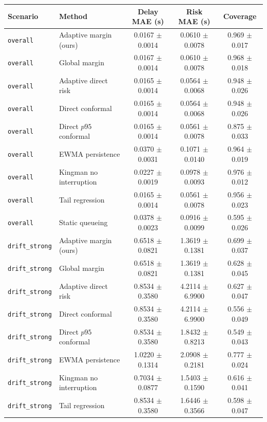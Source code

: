 \begin{tabular}{llccc}
\hline
Scenario & Method & Delay MAE (s) & Risk MAE (s) & Coverage \\
\hline
\texttt{overall} & Adaptive margin (ours) & 0.0167 $\pm$ 0.0014 & 0.0610 $\pm$ 0.0078 & 0.969 $\pm$ 0.017 \\
\texttt{overall} & Global margin & 0.0167 $\pm$ 0.0014 & 0.0610 $\pm$ 0.0078 & 0.968 $\pm$ 0.018 \\
\texttt{overall} & Adaptive direct risk & 0.0165 $\pm$ 0.0014 & 0.0564 $\pm$ 0.0068 & 0.948 $\pm$ 0.026 \\
\texttt{overall} & Direct conformal & 0.0165 $\pm$ 0.0014 & 0.0564 $\pm$ 0.0068 & 0.948 $\pm$ 0.026 \\
\texttt{overall} & Direct $p95$ conformal & 0.0165 $\pm$ 0.0014 & 0.0561 $\pm$ 0.0078 & 0.875 $\pm$ 0.033 \\
\texttt{overall} & EWMA persistence & 0.0370 $\pm$ 0.0031 & 0.1071 $\pm$ 0.0140 & 0.964 $\pm$ 0.019 \\
\texttt{overall} & Kingman no interruption & 0.0227 $\pm$ 0.0019 & 0.0978 $\pm$ 0.0093 & 0.976 $\pm$ 0.012 \\
\texttt{overall} & Tail regression & 0.0165 $\pm$ 0.0014 & 0.0561 $\pm$ 0.0078 & 0.956 $\pm$ 0.023 \\
\texttt{overall} & Static queueing & 0.0378 $\pm$ 0.0023 & 0.0916 $\pm$ 0.0099 & 0.595 $\pm$ 0.026 \\
\hline
\texttt{drift\_strong} & Adaptive margin (ours) & 0.6518 $\pm$ 0.0821 & 1.3619 $\pm$ 0.1381 & 0.699 $\pm$ 0.037 \\
\texttt{drift\_strong} & Global margin & 0.6518 $\pm$ 0.0821 & 1.3619 $\pm$ 0.1381 & 0.628 $\pm$ 0.045 \\
\texttt{drift\_strong} & Adaptive direct risk & 0.8534 $\pm$ 0.3580 & 4.2114 $\pm$ 6.9900 & 0.627 $\pm$ 0.047 \\
\texttt{drift\_strong} & Direct conformal & 0.8534 $\pm$ 0.3580 & 4.2114 $\pm$ 6.9900 & 0.556 $\pm$ 0.049 \\
\texttt{drift\_strong} & Direct $p95$ conformal & 0.8534 $\pm$ 0.3580 & 1.8432 $\pm$ 0.8213 & 0.549 $\pm$ 0.043 \\
\texttt{drift\_strong} & EWMA persistence & 1.0220 $\pm$ 0.1314 & 2.0908 $\pm$ 0.2181 & 0.777 $\pm$ 0.024 \\
\texttt{drift\_strong} & Kingman no interruption & 0.7034 $\pm$ 0.0877 & 1.5403 $\pm$ 0.1590 & 0.616 $\pm$ 0.041 \\
\texttt{drift\_strong} & Tail regression & 0.8534 $\pm$ 0.3580 & 1.6446 $\pm$ 0.3566 & 0.598 $\pm$ 0.047 \\

\end{tabular}
